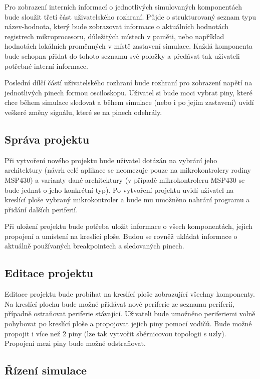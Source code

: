 Pro zobrazení interních informací o jednotlivých simulovaných komponentách bude sloužit třetí část uživatelského rozhraní. Půjde o strukturovaný seznam
typu název-hodnota, který bude zobrazovat informace o aktuálních hodnotách registrech mikroprocesoru, důležitých místech v paměti, nebo například hodnotách
lokálních proměnných v místě zastavení simulace. Každá komponenta bude schopna přidat do tohoto seznamu své položky a předávat tak uživateli potřebné
interní informace.

Poslední dílčí částí uživatelského rozhraní bude rozhraní pro zobrazení napětí na jednotlivých pinech formou osciloskopu. Uživatel si bude moci vybrat
piny, které chce během simulace sledovat a během simulace (nebo i po jejím zastavení) uvidí veškeré změny signálu, které se na pinech odehrály.

\subsection{Správa projektu}

Při vytvoření nového projektu bude uživatel dotázán na vybrání jeho architektury (návrh celé aplikace se neomezuje pouze na mikrokontrolery rodiny MSP430) a varianty dané architektury (v případě mikrokontroleru MSP430 se bude jednat o jeho konkrétní typ). Po vytvoření projektu uvidí uživatel na kreslící ploše vybraný mikrokontroler a bude mu umožněno nahrání programu a přidání dalších periferií.

Při uložení projektu bude potřeba uložit informace o všech komponentách, jejich propojení a umístení na kreslící ploše. Budou se rovněž ukládat informace
o aktuálně používaných breakpointech a sledovaných pinech.

\subsection{Editace projektu}

Editace projektu bude probíhat na kreslící ploše zobrazující všechny komponenty. Na kreslící plochu bude možné přidávat nové periferie ze seznamu periferií, případně ostraňovat periferie stávající. Uživateli bude umožněno periferiemi volně pohybovat po kreslící ploše a propojovat jejich piny pomocí vodičů. Bude možné propojit i více než 2 piny (lze tak vytvořit sběrnicovou topologii s uzly). Propojení mezi piny bude možné odstraňovat.

\subsection{Řízení simulace}

